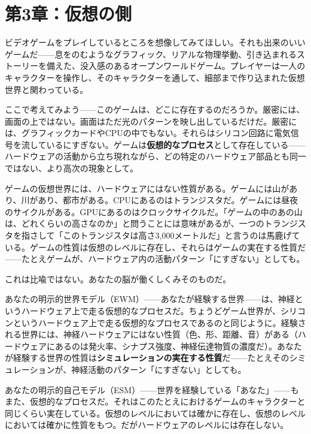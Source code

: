 \documentclass[11pt, twoside, openright]{book}
\begin{document}
\chapter*{第3章：仮想の側}

ビデオゲームをプレイしているところを想像してみてほしい。それも出来のいいゲームだ------息をのむようなグラフィック、リアルな物理挙動、引き込まれるストーリーを備えた、没入感のあるオープンワールドゲーム。プレイヤーは一人のキャラクターを操作し、そのキャラクターを通して、細部まで作り込まれた仮想世界と関わっている。

ここで考えてみよう------このゲームは、どこに存在するのだろうか。厳密には、画面の上ではない。画面はただ光のパターンを映し出しているだけだ。厳密には、グラフィックカードやCPUの中でもない。それらはシリコン回路に電気信号を流しているにすぎない。ゲームは\textbf{仮想的なプロセス}として存在している------ハードウェアの活動から立ち現れながら、どの特定のハードウェア部品とも同一ではない、より高次の現象として。

ゲームの仮想世界には、ハードウェアにはない性質がある。ゲームには山があり、川があり、都市がある。CPUにあるのはトランジスタだ。ゲームには昼夜のサイクルがある。GPUにあるのはクロックサイクルだ。「ゲームの中のあの山は、どれくらいの高さなのか」と問うことには意味があるが、一つのトランジスタを指さして「このトランジスタは高さ3,000メートルだ」と言うのは馬鹿げている。ゲームの性質は仮想のレベルに存在し、それらはゲームの実在する性質だ------たとえゲームが、ハードウェア内の活動パターン「にすぎない」としても。

これは比喩ではない。あなたの脳が働くしくみそのものだ。

あなたの明示的世界モデル（EWM）------あなたが経験する世界------は、神経というハードウェア上で走る仮想的なプロセスだ。ちょうどゲーム世界が、シリコンというハードウェア上で走る仮想的なプロセスであるのと同じように。経験される世界には、神経ハードウェアにはない性質（色、形、距離、音）がある（ハードウェアにあるのは発火率、シナプス強度、神経伝達物質の濃度だ）。あなたが経験する世界の性質は\textbf{シミュレーションの実在する性質}だ------たとえそのシミュレーションが、神経活動のパターン「にすぎない」としても。

あなたの明示的自己モデル（ESM）------世界を経験している「あなた」------もまた、仮想的なプロセスだ。それはこのたとえにおけるゲームのキャラクターと同じくらい実在している。仮想のレベルにおいては確かに存在し、仮想のレベルにおいては確かに性質をもつ。だがハードウェアのレベルには存在しない。
\end{document}

